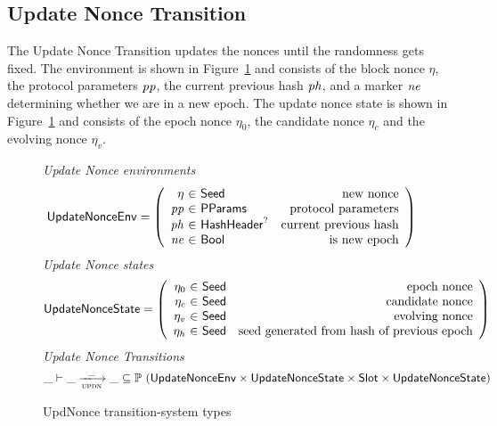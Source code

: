 \clearpage

\subsection{Update Nonce Transition}
\label{sec:update-nonces-trans}

The Update Nonce Transition updates the nonces until the randomness gets fixed.
The environment is shown in Figure~\ref{fig:ts-types:updnonce} and consists of
the block nonce $\eta$, the protocol parameters $\mathit{pp}$, the current previous hash $\mathit{ph}$,
and a marker $\mathit{ne}$ determining whether we are in a new epoch.
The update nonce state is shown in Figure~\ref{fig:ts-types:updnonce} and consists of
the epoch nonce $\eta_0$, the candidate nonce $\eta_c$ and the evolving nonce $\eta_v$.

\begin{figure}
  \emph{Update Nonce environments}
  \begin{equation*}
    \UpdateNonceEnv =
    \left(
      \begin{array}{r@{~\in~}lr}
        \eta & \Seed & \text{new nonce} \\
        \var{pp} & \PParams & \text{protocol parameters} \\
        \var{ph} & \HashHeader^? & \text{current previous hash} \\
        \var{ne} & \Bool & \text{is new epoch} \\
      \end{array}
    \right)
  \end{equation*}
  \emph{Update Nonce states}
  \begin{equation*}
    \UpdateNonceState =
    \left(
      \begin{array}{r@{~\in~}lr}
        \eta_0 & \Seed & \text{epoch nonce} \\
        \eta_c & \Seed & \text{candidate nonce} \\
        \eta_v & \Seed & \text{evolving nonce} \\
        \eta_h & \Seed & \text{seed generated from hash of previous epoch} \\
      \end{array}
    \right)
  \end{equation*}
  \emph{Update Nonce Transitions}
  \begin{equation*}
    \_ \vdash \var{\_} \trans{updn}{\_} \var{\_} \subseteq
    \powerset (\UpdateNonceEnv
               \times \UpdateNonceState
               \times \Slot
               \times \UpdateNonceState
              )
  \end{equation*}
  \caption{UpdNonce transition-system types}
  \label{fig:ts-types:updnonce}
\end{figure}

